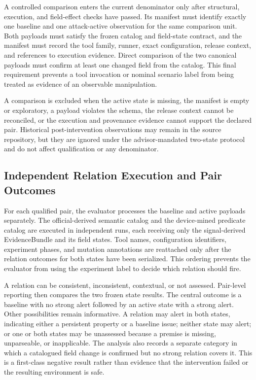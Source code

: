 A controlled comparison enters the current denominator only after structural, execution, and field-effect checks have passed. Its manifest must identify exactly one baseline and one attack-active observation for the same comparison unit. Both payloads must satisfy the frozen \appfp catalog and field-state contract, and the manifest must record the tool family, runner, exact configuration, release context, and references to execution evidence. Direct comparison of the two canonical payloads must confirm at least one changed field from the catalog. This final requirement prevents a tool invocation or nominal scenario label from being treated as evidence of an observable manipulation.

A comparison is excluded when the active state is missing, the manifest is empty or exploratory, a payload violates the schema, the release context cannot be reconciled, or the execution and provenance evidence cannot support the declared pair. Historical post-intervention observations may remain in the source repository, but they are ignored under the advisor-mandated two-state protocol and do not affect qualification or any denominator.

\subsection{Independent Relation Execution and Pair Outcomes}

For each qualified pair, the evaluator processes the baseline and active payloads separately. The official-derived semantic catalog and the device-mined predicate catalog are executed in independent runs, each receiving only the signal-derived EvidenceBundle and its field states. Tool names, configuration identifiers, experiment phases, and mutation annotations are reattached only after the relation outcomes for both states have been serialized. This ordering prevents the evaluator from using the experiment label to decide which relation should fire.

A relation can be consistent, inconsistent, contextual, or not assessed. Pair-level reporting then compares the two frozen state results. The central outcome is a baseline with no strong alert followed by an active state with a strong alert. Other possibilities remain informative. A relation may alert in both states, indicating either a persistent property or a baseline issue; neither state may alert; or one or both states may be unassessed because a premise is missing, unparseable, or inapplicable. The analysis also records a separate category in which a catalogued field change is confirmed but no strong relation covers it. This is a first-class negative result rather than evidence that the intervention failed or the resulting environment is safe.

